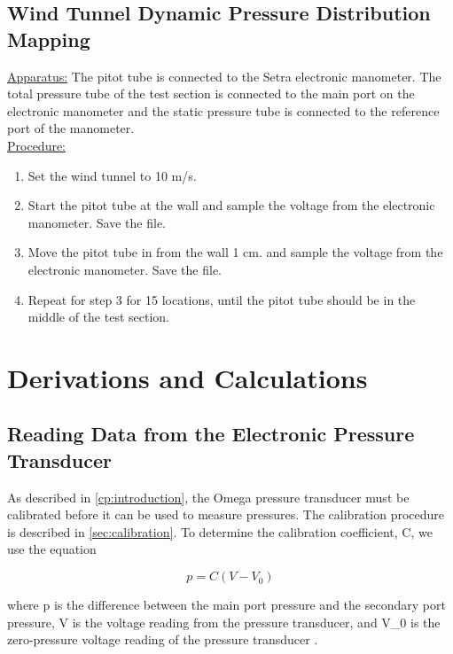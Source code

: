 \subsection{Wind Tunnel Dynamic Pressure Distribution Mapping}\label{subsec:dynamic_pressure_mapping}

\underline{Apparatus:} The pitot tube is connected to the Setra electronic manometer. The total pressure tube of the test section is connected to the main port on the electronic manometer and the static pressure tube is connected to the reference port of the manometer. \\
\underline{Procedure:}
\begin{enumerate}
    \item Set the wind tunnel to 10 m/s. 
    \item Start the pitot tube at the wall and sample the voltage from the electronic manometer. Save the file. 
    \item Move the pitot tube in from the wall 1 cm. and sample the voltage from the electronic manometer. Save the file.  
    \item Repeat for step 3 for 15 locations, until the pitot tube should be in the middle of the test section.
\end{enumerate}

\section{Derivations and Calculations}

\subsection{Reading Data from the Electronic Pressure Transducer}

As described in \autoref{cp:introduction}, the Omega pressure transducer must be calibrated before it can be used to measure pressures. The calibration procedure is described in \autoref{sec:calibration}. To determine the calibration coefficient, \gls{C}, we use the equation

\begin{equation}\label{eq:calibration_eqn}
    p = C(V - V_0)
\end{equation}

\noindent{}where \gls{p} is the difference between the main port pressure and the secondary port pressure, \gls{V} is the voltage reading from the pressure transducer, and \gls{V_0} is the zero-pressure voltage reading of the pressure transducer \citep{lab3-manual}.


